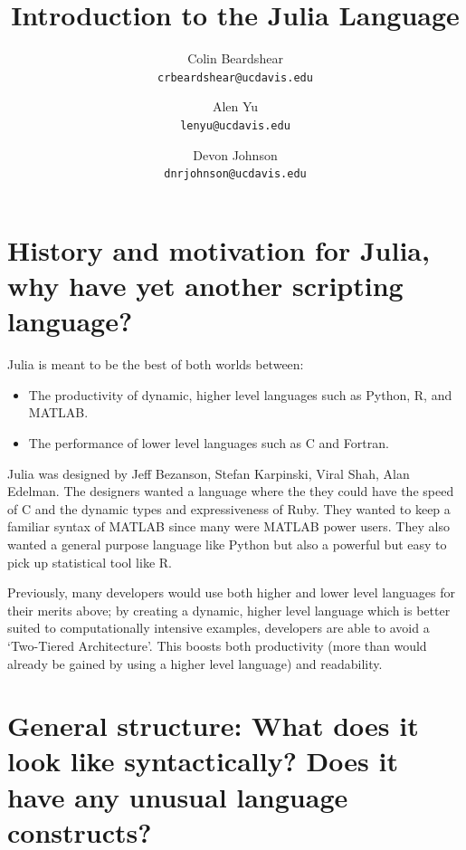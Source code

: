 \documentclass[10pt]{article}
\title{Introduction to the Julia Language}
\author{Colin Beardshear\\ \texttt{crbeardshear@ucdavis.edu} \and
Alen Yu\\ \texttt{lenyu@ucdavis.edu} \and
Devon Johnson\\ \texttt{dnrjohnson@ucdavis.edu}
}
\begin{document}
\maketitle


\section*{\normalsize History and motivation for Julia, why have yet another scripting language?}

Julia is meant to be the best of both worlds between:
\begin{itemize}
\item The productivity of dynamic, higher level languages such as Python, R, and MATLAB.
\item The performance of lower level languages such as C and Fortran.
\end{itemize}
Julia was designed by Jeff Bezanson, Stefan Karpinski, Viral Shah, Alan Edelman. The designers wanted a language where the they could have the speed of C and the dynamic types and expressiveness of Ruby. They wanted to keep a familiar syntax of MATLAB since many were MATLAB power users. They also wanted a general purpose language like Python but also a powerful but easy to pick up statistical tool like R.

Previously, many developers would use both higher and lower level languages for their merits above; by creating a dynamic, higher level language which is better suited to computationally intensive examples, developers are able to avoid a `Two-Tiered Architecture'\cite{juliadevs}. This boosts both productivity (more than would already be gained by using a higher level language) and readability.

\section*{\normalsize General structure: What does it look like syntactically? Does it have any unusual language constructs?}
\end{document}
